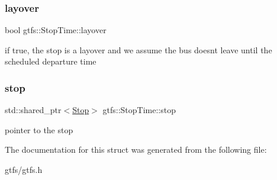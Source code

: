 \subsubsection{\texorpdfstring{layover}{layover}}
{\footnotesize\ttfamily bool gtfs\+::\+Stop\+Time\+::layover}

if true, the stop is a layover and we assume the bus doesn\textquotesingle{}t leave until the scheduled departure time \mbox{\label{structgtfs_1_1StopTime_a586702c54a1ad350d486c6639558b4ca}} 
\subsubsection{\texorpdfstring{stop}{stop}}
{\footnotesize\ttfamily std\+::shared\+\_\+ptr$<$\hyperlink{classgtfs_1_1Stop}{Stop}$>$ gtfs\+::\+Stop\+Time\+::stop}

pointer to the stop 

The documentation for this struct was generated from the following file\+:\begin{DoxyCompactItemize}
\item 
gtfs/gtfs.\+h\end{DoxyCompactItemize}
